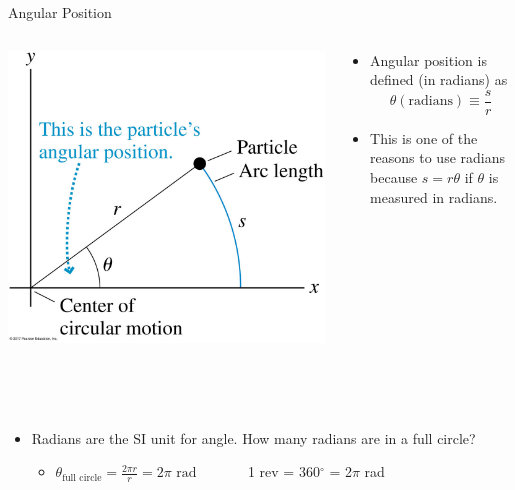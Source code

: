 \documentclass{beamer}
\begin{document}
\begin{frame}{Angular Position}
\begin{columns}
\begin{column}{0.4\textwidth}
   \begin{center}
      \includegraphics[width=\textwidth]{../figures/04_22_Figure.jpg}
   \end{center}
\end{column}
\begin{column}{0.6\textwidth}
   \begin{itemize}
      \item Angular position is defined (in radians) as
      \begin{equation*}
         \theta(\text{radians}) \equiv \frac{s}{r}
      \end{equation*}
      \item<1-> This is one of the reasons to use radians because $s=r\theta$ if $\theta$ is measured in radians.
   \end{itemize}
\end{column}
\end{columns}
~\\~
\begin{itemize}
   \item<2-> Radians are the SI unit for angle. How many radians are in a full circle?
   \begin{itemize}
      \item<3-> $\theta_{\text{full circle}} = \frac{2\pi r}{r} = 2\pi\text{ rad}$ ~~~~~~  1 rev = 360$^\circ$ = 2$\pi$ rad
   \end{itemize}
\end{itemize}
\end{frame}
\end{document}
